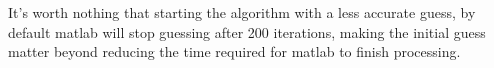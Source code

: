 \documentclass[11pt]{article} %
\begin{document}
It's worth nothing that starting the algorithm with a less accurate guess, by default matlab will stop guessing after 200 iterations, making the initial guess matter beyond reducing the time required for matlab to finish processing.
%
%
\end{document}
